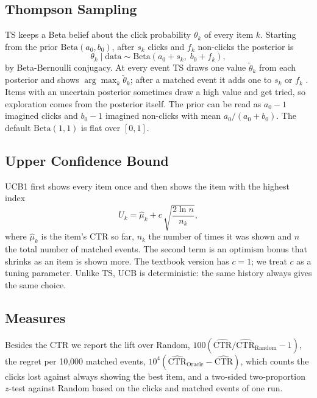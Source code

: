 \documentclass[11pt]{article}
\begin{document}
\subsection{Thompson Sampling}

TS keeps a Beta belief about the click probability $\theta_k$ of every item
$k$. Starting from the prior $\text{Beta}(a_0, b_0)$, after $s_k$ clicks and
$f_k$ non-clicks the posterior is
%
\begin{equation}
  \theta_k \mid \text{data} \sim \text{Beta}(a_0 + s_k,\; b_0 + f_k),
  \label{eq:ts}
\end{equation}
%
by Beta-Bernoulli conjugacy. At every event TS draws one value
$\tilde\theta_k$ from each posterior and shows $\arg\max_k \tilde\theta_k$;
after a matched event it adds one to $s_k$ or $f_k$ \citep{russo2018}.
Items with an uncertain posterior sometimes draw a high value and get tried,
so exploration comes from the posterior itself. The prior can be read as
$a_0-1$ imagined clicks and $b_0-1$ imagined non-clicks with mean
$a_0/(a_0+b_0)$. The default $\text{Beta}(1,1)$ is flat over $[0,1]$.

\subsection{Upper Confidence Bound}

UCB1 \citep{auer2002} first shows every item once and then shows the item with
the highest index
%
\begin{equation}
  U_k = \hat\mu_k + c\,\sqrt{\frac{2\ln n}{n_k}},
  \label{eq:ucb}
\end{equation}
%
where $\hat\mu_k$ is the item's CTR so far, $n_k$ the number of times it was
shown and $n$ the total number of matched events. The second term is an
optimism bonus that shrinks as an item is shown more. The textbook version has
$c=1$; we treat $c$ as a tuning parameter. Unlike TS, UCB is deterministic:
the same history always gives the same choice.

\subsection{Measures}

Besides the CTR we report the lift over Random,
$100(\widehat{\text{CTR}}/\widehat{\text{CTR}}_{\text{Random}} - 1)$, the
regret per 10{,}000 matched events,
$10^4(\widehat{\text{CTR}}_{\text{Oracle}} - \widehat{\text{CTR}})$, which
counts the clicks lost against always showing the best item, and a two-sided
two-proportion $z$-test against Random based on the clicks and matched events
of one run.
\end{document}
